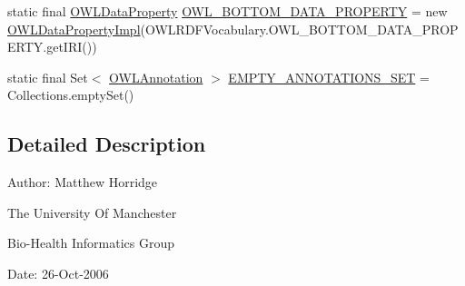\begin{DoxyCompactItemize}
\item 
static final \hyperlink{interfaceorg_1_1semanticweb_1_1owlapi_1_1model_1_1_o_w_l_data_property}{O\-W\-L\-Data\-Property} \hyperlink{classuk_1_1ac_1_1manchester_1_1cs_1_1owl_1_1owlapi_1_1_o_w_l_data_factory_impl_aa3616f1b88e47fafa568252d0c76a36a}{O\-W\-L\-\_\-\-B\-O\-T\-T\-O\-M\-\_\-\-D\-A\-T\-A\-\_\-\-P\-R\-O\-P\-E\-R\-T\-Y} = new \hyperlink{classuk_1_1ac_1_1manchester_1_1cs_1_1owl_1_1owlapi_1_1_o_w_l_data_property_impl}{O\-W\-L\-Data\-Property\-Impl}(O\-W\-L\-R\-D\-F\-Vocabulary.\-O\-W\-L\-\_\-\-B\-O\-T\-T\-O\-M\-\_\-\-D\-A\-T\-A\-\_\-\-P\-R\-O\-P\-E\-R\-T\-Y.\-get\-I\-R\-I())
\item 
static final Set$<$ \hyperlink{interfaceorg_1_1semanticweb_1_1owlapi_1_1model_1_1_o_w_l_annotation}{O\-W\-L\-Annotation} $>$ \hyperlink{classuk_1_1ac_1_1manchester_1_1cs_1_1owl_1_1owlapi_1_1_o_w_l_data_factory_impl_a8e09e00d255ffc777175b89d5cbe8332}{E\-M\-P\-T\-Y\-\_\-\-A\-N\-N\-O\-T\-A\-T\-I\-O\-N\-S\-\_\-\-S\-E\-T} = Collections.\-empty\-Set()
\end{DoxyCompactItemize}


\subsection{Detailed Description}
Author\-: Matthew Horridge\par
 The University Of Manchester\par
 Bio-\/\-Health Informatics Group\par
 Date\-: 26-\/\-Oct-\/2006\par
 \par
 

